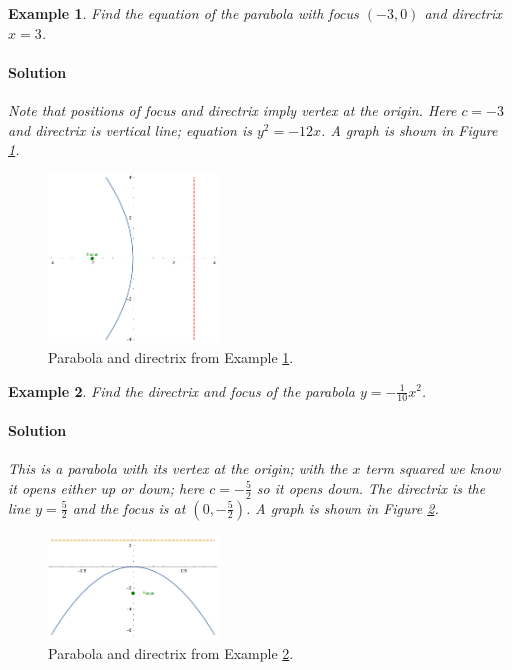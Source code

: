 \documentclass[letterpaper, 11pt, openany]{book}
\theoremstyle{mytheoremstyle}
\theoremstyle{myexamplestyle}
\newtheorem{example}{Example}[section]
\newenvironment{solution}{\paragraph{\sffamily \smaller \fontseries{b}\selectfont Solution}}{\hfill\faSquare}
\begin{document}
\begin{example}\label{e:parabolaleft}
    Find the equation of the parabola with focus $(-3, 0)$ and directrix $x = 3$.
    \begin{solution}
        Note that positions of focus and directrix imply vertex at the origin. Here $c = -3$ and directrix is vertical line; equation is $y^2 = -12x$. A graph is shown in Figure \ref{f:parabolaleft}.
    \end{solution}
\end{example}

\begin{figure}[htbp]
    \centering
        \includegraphics[width=0.4\textwidth]{Figures/parabolaleft.pdf}
    \caption{Parabola and directrix from Example \ref{e:parabolaleft}.}
    \label{f:parabolaleft}
\end{figure}

\begin{example}\label{e:paraboladown}
    Find the directrix and focus of the parabola $y = -\frac{1}{10}x^{2}$.
    \begin{solution}
        This is a parabola with its vertex at the origin; with the $x$ term squared we know it opens either up or down; here $c = -\frac{5}{2}$ so it opens down. The directrix is the line $y = \frac{5}{2}$ and the focus is at $(0, -\frac{5}{2})$. A graph is shown in Figure \ref{f:paraboladown}.
    \end{solution}
\end{example}

\begin{figure}[htbp]
    \centering
        \includegraphics[width=0.4\textwidth]{Figures/paraboladown.pdf}
    \caption{Parabola and directrix from Example \ref{e:paraboladown}.}
    \label{f:paraboladown}
\end{figure}
\end{document}
